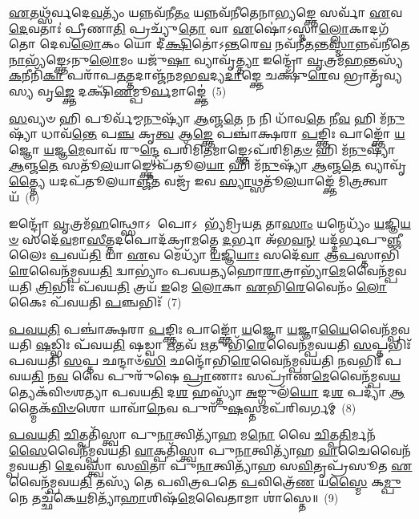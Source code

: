 \-\ul{𑌏}\-𑌤𑌥𑍍𑌸᳴𑌰𑍍𑌵𑌦𑍇\-\ul{𑌵}\-𑌤𑍍𑌯𑌂᳴ 𑌯𑌨𑍍𑌨𑌵᳴𑌨𑍀\-\ul{𑌤𑌂} 𑌯𑌨𑍍𑌨𑌵᳴𑌨𑍀𑌤𑍇𑌨𑌾\-\ul{𑌭𑍍𑌯}\-𑌙𑍍𑌕𑍍𑌤𑍇 𑌸𑌰𑍍𑌵𑌾᳴ \ul{𑌏}\-𑌵 \ul{𑌦𑍇}\-𑌵𑌤𑌾𑌃॑ 𑌪𑍍𑌰𑍀𑌣𑌾\-\ul{𑌤𑌿} 𑌪𑍍𑌰𑌚𑍍𑌯𑍁᳴\-\ul{𑌤𑍋} 𑌵𑌾 \ul{𑌏}\-𑌷𑍋॑\-𑌽𑌸𑍍𑌮𑌾\-\ul{𑌲𑍍𑌲𑍋}\-𑌕𑌾𑌦𑌗᳴𑌤𑍋 𑌦𑍇𑌵\-\ul{𑌲𑍋}\-𑌕𑌂 𑌯𑍋 𑌦𑍀॑\-\ul{𑌕𑍍𑌷𑌿}\-𑌤𑍋॑\-𑌽\-\ul{𑌨𑍍𑌤}\-𑌰𑍇\-\ul{𑌵} 𑌨𑌵᳴𑌨𑍀\-\ul{𑌤}\-𑌨𑍍𑌤\-\ul{𑌸𑍍𑌮𑌾}\-𑌨𑍍𑌨𑌵᳴𑌨𑍀𑌤𑍇\-\ul{𑌨𑌾}\-𑌭𑍍𑌯᳴𑌙𑍍𑌕𑍍𑌤𑍇\-𑌽𑌨𑍁\-\ul{𑌲𑍋}\-𑌮𑌂 𑌯𑌜𑍁᳴\-\ul{𑌷𑌾} 𑌵𑍍𑌯𑌾𑌵𑍃᳴\-\ul{𑌤𑍍𑌤𑍍𑌯𑌾} 𑌇𑌨𑍍𑌦𑍍𑌰𑍋᳴ \ul{𑌵𑍃}\-𑌤𑍍𑌰𑌮᳴\-\ul{𑌹}\-𑌨𑍍𑌤𑌸𑍍𑌯᳴ \ul{𑌕}\-𑌨𑍀𑌨𑌿᳴\-\ul{𑌕𑌾} 𑌪𑌰𑌾᳴𑌪\-\ul{𑌤}\-𑌤𑍍𑌤𑌦𑌾𑌞𑍍𑌜᳴𑌨𑌮𑌭\-\ul{𑌵}\-𑌦𑍍𑌯\-\ul{𑌦𑌾}\-𑌙𑍍𑌕𑍍𑌤𑍇 𑌚𑌕𑍍𑌷𑍁᳴\-\ul{𑌰𑍇}\-𑌵 𑌭𑍍𑌰𑌾𑌤𑍃᳴𑌵𑍍𑌯𑌸𑍍𑌯 𑌵𑍃\-\ul{𑌙𑍍𑌕𑍍𑌤𑍇} 𑌦𑌕𑍍𑌷𑌿᳴\-\ul{𑌣}\-𑌮𑍍𑌪𑍂\-\ul{𑌰𑍍𑌵}\-𑌮𑌾𑌙𑍍𑌕𑍍𑌤𑍇॑~(5)

\-\ul{𑌸}\-𑌵𑍍𑌯𑍞 𑌹𑌿 𑌪𑍂𑌰𑍍𑌵᳴𑌮𑍍𑌮\-\ul{𑌨𑍁}\-𑌷𑍍𑌯𑌾᳴ \ul{𑌆}\-𑌞𑍍𑌜\-\ul{𑌤𑍇} 𑌨 𑌨𑌿 𑌧𑌾᳴𑌵\-\ul{𑌤𑍇} 𑌨𑍀\-\ul{𑌵} 𑌹𑌿 𑌮᳴\-\ul{𑌨𑍁}\-𑌷𑍍𑌯𑌾᳴ 𑌧𑌾𑌵᳴\-\ul{𑌨𑍍𑌤𑍇} 𑌪\-\ul{𑌞𑍍𑌚} 𑌕𑍃\-\ul{𑌤𑍍𑌵} 𑌆\-\ul{𑌙𑍍𑌕𑍍𑌤𑍇} 𑌪𑌞𑍍𑌚𑌾॑𑌕𑍍𑌷𑌰𑌾 \ul{𑌪}\-𑌙𑍍𑌕𑍍𑌤𑌿𑌃 𑌪𑌾𑌙𑍍𑌕𑍍𑌤𑍋᳴ \ul{𑌯}\-𑌜𑍍𑌞𑍋 \ul{𑌯}\-𑌜𑍍𑌞\-\ul{𑌮𑍇}\-𑌵𑌾𑌵᳴ 𑌰𑍁\-\ul{𑌨𑍍𑌦𑍍𑌧𑍇} 𑌪𑌰𑌿᳴𑌮𑌿\-\ul{𑌤}\-𑌮𑌾𑌙𑍍𑌕𑍍𑌤𑍇\-𑌽𑌪᳴𑌰𑌿𑌮𑌿\-\ul{𑌤}\-\-\ul{𑍞} 𑌹𑌿 𑌮᳴\-\ul{𑌨𑍁}\-𑌷𑍍𑌯𑌾᳴ \ul{𑌆}\-𑌞𑍍𑌜\-\ul{𑌤𑍇} 𑌸𑌤𑍂᳴\-\ul{𑌲}\-𑌯𑌾𑌙𑍍𑌕𑍍𑌤𑍇\-𑌽𑌪᳴𑌤𑍂𑌲\-\ul{𑌯𑌾} 𑌹𑌿 𑌮᳴\-\ul{𑌨𑍁}\-𑌷𑍍𑌯𑌾᳴ \ul{𑌆}\-𑌞𑍍𑌜\-\ul{𑌤𑍇} 𑌵𑍍𑌯𑌾𑌵𑍃᳴\-\ul{𑌤𑍍𑌤𑍍𑌯𑍈} 𑌯𑌦𑌪᳴𑌤𑍂𑌲𑌯𑌾\-\ul{𑌞𑍍𑌜𑍀}\-𑌤 𑌵𑌜𑍍𑌰᳴ 𑌇𑌵 \ul{𑌸𑍍𑌯𑌾}\-𑌥𑍍𑌸𑌤𑍂᳴\-\ul{𑌲}\-𑌯𑌾𑌙𑍍𑌕𑍍𑌤𑍇᳴ 𑌮𑌿\-\ul{𑌤𑍍𑌰}\-𑌤𑍍𑌵𑌾𑌯᳴~(6)

𑌇𑌨𑍍𑌦𑍍𑌰𑍋᳴ \ul{𑌵𑍃}\-𑌤𑍍𑌰𑌮᳴\-\ul{𑌹}\-𑌨𑍍𑌥𑍍𑌸𑍋\-𑌽 𑌪𑍋\-𑌽 𑌭𑍍𑌯᳴𑌮𑍍𑌰𑌿𑌯\-\ul{𑌤} 𑌤𑌾\-\ul{𑌸𑌾𑌂} 𑌯𑌨𑍍𑌮𑍇𑌧𑍍𑌯𑌂᳴ \ul{𑌯}\-𑌜𑍍𑌞𑌿\-\ul{𑌯}\-\-\ul{𑍞} 𑌸𑌦𑍇᳴\-\ul{𑌵}\-𑌮𑌾\-\ul{𑌸𑍀}\-𑌤𑍍𑌤𑌦𑌪𑍋𑌦᳴𑌕𑍍𑌰𑌾\-\ul{𑌮}\-𑌤𑍍𑌤𑍇 \ul{𑌦}\-𑌰𑍍𑌭𑌾 𑌅᳴𑌭\-\ul{𑌵}\-\-\ul{𑌨𑍍} 𑌯𑌦𑍍𑌦᳴𑌰𑍍𑌭𑌪𑍁\-\ul{𑌞𑍍𑌜𑍀}\-𑌲𑍈𑌃 \ul{𑌪}\-𑌵𑌯᳴\-\ul{𑌤𑌿} 𑌯𑌾 \ul{𑌏}\-𑌵 𑌮𑍇𑌧𑍍𑌯𑌾᳴ \ul{𑌯}\-𑌜𑍍𑌞𑌿\-\ul{𑌯𑌾𑌃} 𑌸𑌦𑍇᳴\-\ul{𑌵𑌾} 𑌆\-\ul{𑌪}\-𑌸𑍍𑌤𑌾𑌭𑌿᳴\-\ul{𑌰𑍇}\-𑌵𑍈𑌨᳴𑌮𑍍𑌪𑌵𑌯\-\ul{𑌤𑌿} 𑌦𑍍𑌵𑌾\-𑌭𑍍𑌯𑌾𑌂॑ 𑌪𑌵𑌯𑌤𑍍𑌯𑌹𑍋\-\ul{𑌰𑌾}\-𑌤𑍍𑌰𑌾𑌭𑍍𑌯𑌾᳴\-\ul{𑌮𑍇}\-𑌵𑍈𑌨᳴𑌮𑍍𑌪𑌵𑌯𑌤𑌿 \ul{𑌤𑍍𑌰𑌿}\-𑌭𑌿𑌃 𑌪᳴𑌵𑌯\-\ul{𑌤𑌿} 𑌤𑍍𑌰𑌯᳴ \ul{𑌇}\-𑌮𑍇 \ul{𑌲𑍋}\-𑌕𑌾 \ul{𑌏}\-𑌭𑌿\-\ul{𑌰𑍇}\-𑌵𑍈𑌨𑌂᳴ \ul{𑌲𑍋}\-𑌕𑍈𑌃 𑌪᳴𑌵𑌯𑌤𑌿 \ul{𑌪}\-𑌞𑍍𑌚𑌭𑌿𑌃᳴~(7)

\-\ul{𑌪}\-\-\ul{𑌵}\-\-\ul{𑌯}\-\-\ul{𑌤𑌿} 𑌪𑌞𑍍𑌚𑌾॑𑌕𑍍𑌷𑌰𑌾 \ul{𑌪}\-𑌙𑍍𑌕𑍍𑌤𑌿𑌃 𑌪𑌾𑌙𑍍𑌕𑍍𑌤𑍋᳴ \ul{𑌯}\-𑌜𑍍𑌞𑍋 \ul{𑌯}\-𑌜𑍍𑌞𑌾\-\ul{𑌯𑍈}\-𑌵𑍈𑌨᳴𑌮𑍍𑌪𑌵𑌯𑌤𑌿 \ul{𑌷}\-𑌡𑍍𑌭𑌿𑌃 𑌪᳴𑌵𑌯\-\ul{𑌤𑌿} 𑌷𑌡𑍍𑌵𑌾 \ul{𑌋}\-𑌤𑌵᳴ \ul{𑌋}\-𑌤𑍁𑌭𑌿᳴\-\ul{𑌰𑍇}\-𑌵𑍈𑌨᳴𑌮𑍍𑌪𑌵𑌯𑌤𑌿 \ul{𑌸}\-𑌪𑍍𑌤𑌭𑌿𑌃᳴ 𑌪𑌵𑌯𑌤𑌿 \ul{𑌸}\-𑌪𑍍𑌤 𑌛𑌨𑍍𑌦𑌾𑍞᳴\-\ul{𑌸𑌿} 𑌛𑌨𑍍𑌦𑍋᳴𑌭𑌿\-\ul{𑌰𑍇}\-𑌵𑍈𑌨᳴𑌮𑍍𑌪𑌵𑌯𑌤𑌿 \ul{𑌨}\-𑌵𑌭𑌿𑌃᳴ 𑌪𑌵𑌯\-\ul{𑌤𑌿} 𑌨\-\ul{𑌵} 𑌵𑍈 𑌪𑍁𑌰𑍁᳴𑌷𑍇 \ul{𑌪𑍍𑌰𑌾}\-𑌣𑌾𑌃 𑌸𑌪𑍍𑌰𑌾᳴𑌣\-\ul{𑌮𑍇}\-𑌵𑍈𑌨᳴𑌮𑍍𑌪𑌵\-\-\ul{𑌯}\-𑌤𑍍𑌯𑍇𑌕᳴𑌵𑌿𑍞𑌶𑌤𑍍𑌯𑌾 𑌪𑌵𑌯\-\ul{𑌤𑌿} 𑌦\-\ul{𑌶} 𑌹𑌸𑍍𑌤𑍍𑌯𑌾᳴ \ul{𑌅}\-𑌙𑍍𑌗𑍁𑌲᳴\-\ul{𑌯𑍋} 𑌦\-\ul{𑌶} 𑌪𑌦𑍍𑌯𑌾᳴ \ul{𑌆}\-𑌤𑍍𑌮𑍈𑌕᳴\-\ul{𑌵𑌿}\-\-\ul{𑍞}\-𑌶𑍋 𑌯𑌾𑌵𑌾᳴\-\ul{𑌨𑍇}\-𑌵 𑌪𑍁𑌰𑍁᳴\-\ul{𑌷}\-𑌸𑍍𑌤𑌮𑌪᳴𑌰𑌿𑌵𑌰𑍍𑌗𑌮𑍍~(8)

\-\ul{𑌪}\-\-\ul{𑌵}\-\-\ul{𑌯}\-\-\ul{𑌤𑌿} \ul{𑌚𑌿}\-𑌤𑍍𑌪𑌤𑌿᳴𑌸𑍍𑌤𑍍𑌵𑌾 𑌪𑍁\-\ul{𑌨𑌾}\-𑌤𑍍𑌵𑌿𑌤𑍍𑌯𑌾᳴\-\ul{𑌹} 𑌮\-\ul{𑌨𑍋} 𑌵𑍈 \ul{𑌚𑌿}\-𑌤𑍍𑌪\-\ul{𑌤𑌿}\-𑌰𑍍𑌮𑌨᳴\-\ul{𑌸𑍈}\-𑌵𑍈𑌨᳴𑌮𑍍𑌪𑌵𑌯𑌤𑌿 \ul{𑌵𑌾}\-𑌕𑍍𑌪𑌤𑌿᳴𑌸𑍍𑌤𑍍𑌵𑌾 𑌪𑍁\-\ul{𑌨𑌾}\-𑌤𑍍𑌵𑌿𑌤𑍍𑌯𑌾᳴𑌹 \ul{𑌵𑌾}\-𑌚𑍈𑌵𑍈𑌨᳴𑌮𑍍𑌪𑌵𑌯𑌤𑌿 \ul{𑌦𑍇}\-𑌵𑌸𑍍𑌤𑍍𑌵𑌾᳴ 𑌸\-\ul{𑌵𑌿}\-𑌤𑌾 𑌪𑍁᳴\-\ul{𑌨𑌾}\-𑌤𑍍𑌵𑌿𑌤𑍍𑌯𑌾᳴𑌹 𑌸\-\ul{𑌵𑌿}\-𑌤𑍃𑌪𑍍𑌰᳴𑌸𑍂𑌤 \ul{𑌏}\-𑌵𑍈𑌨᳴𑌮𑍍𑌪𑌵𑌯\-\ul{𑌤𑌿} 𑌤𑌸𑍍𑌯᳴ 𑌤𑍇 𑌪𑌵𑌿𑌤𑍍𑌰𑌪𑌤𑍇 \ul{𑌪}\-𑌵𑌿𑌤𑍍𑌰𑍇᳴\-\ul{𑌣} 𑌯\-\ul{𑌸𑍍𑌮𑍈} 𑌕\-\ul{𑌮𑍍𑌪𑍁}\-𑌨𑍇 𑌤𑌚𑍍𑌛᳴𑌕𑍇\-\ul{𑌯}\-𑌮𑌿𑌤𑍍𑌯𑌾᳴\-\ul{𑌹𑌾}\-𑌶𑌿𑌷᳴\-\ul{𑌮𑍇}\-𑌵𑍈𑌤𑌾𑌮𑌾 𑌶𑌾॑𑌸𑍍𑌤𑍇॥~(9)

